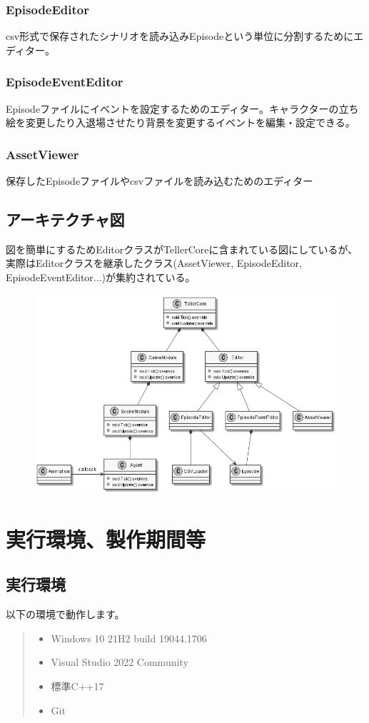 \documentclass[12pt,a4paper,uplatex,dvipdfmx]{jsarticle}
\begin{document}
\subsubsection{EpisodeEditor}
csv形式で保存されたシナリオを読み込みEpisodeという単位に分割するためにエディター。

\subsubsection{EpisodeEventEditor}
Episodeファイルにイベントを設定するためのエディター。キャラクターの立ち絵を変更したり入退場させたり背景を変更するイベントを編集・設定できる。

\subsubsection{AssetViewer}
保存したEpisodeファイルやcsvファイルを読み込むためのエディター

\subsection{アーキテクチャ図}
図を簡単にするためEditorクラスがTellerCoreに含まれている図にしているが、実際はEditorクラスを継承したクラス(AssetViewer, EpisodeEditor, EpisodeEventEditor...)が集約されている。
\begin{figure}[tb]
  \centering
  \includegraphics[width=120mm]{architecture.png}
\end{figure}

\newpage
\section{実行環境、製作期間等}
\subsection{実行環境}
以下の環境で動作します。
\begin{quote}
  \begin{itemize}
    \item Windows 10 21H2 build 19044.1706
    \item Visual Studio 2022 Community
    \item 標準C++17
    \item Git
  \end{itemize}
\end{quote}
\end{document}
